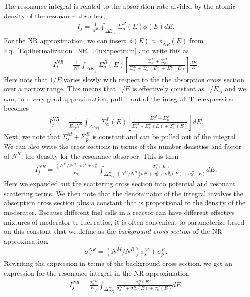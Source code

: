 The resonance integral is related to the absorption rate divided by the atomic density of the resonance absorber,
\begin{align}
  I_j = \frac{1}{N^R} \int_{\Delta E_{rj}} \Sigma_a^R(E) \phi(E) dE .
\end{align}
For the NR approximation, we can insert $\phi(E) \approx \phi_{NR}(E)$ from Eq.~\eqref{Eq:thermalization_NR_FluxSpectrum} and write this as
\begin{align}
  I_j^{NR} = \frac{1}{N^R} \int_{\Delta E_{rj}} \Sigma_a^R(E)  \left[ \frac{ \Sigma_s^M + \Sigma_p^R }{ \Sigma_s^M + \Sigma_s^R(E) + \Sigma_a^R(E) } \right] \frac{dE}{E} . \nonumber
\end{align}
Here note that $1/E$ varies slowly with respect to the the absorption cross section over a narrow range. This means that $1/E$ is effectively constant as $1/E_{rj}$ and we can, to a very good approximation, pull it out of the integral. The expression becomes
\begin{align}
  I_j^{NR} = \frac{1}{E_{rj} N^R} \int_{\Delta E_{rj}} \Sigma_a^R(E)  \left[ \frac{ \Sigma_s^M + \Sigma_p^R }{ \Sigma_s^M + \Sigma_s^R(E) + \Sigma_a^R(E) } \right] dE . \nonumber
\end{align}
Next, we note that $\Sigma_s^M + \Sigma_p^R$ is constant and can be pulled out of the integral. We can also write the cross sections in terms of the number densities and factor of $N^R$, the density for the resonance absorber. This is then
\begin{align}
  I_j^{NR} = \frac{(N^M/N^R) \sigma_s^M + \sigma_p^R }{E_{rj}} \int_{\Delta E_{rj}} \frac{ \sigma_a^R(E)  }{ (N^M/N^R) \sigma_s^M + \sigma_p^R + \sigma_{rs}^R(E) + \sigma_a^R(E) } dE .  \label{Eq:thermalization_resonanceIntegral_NR_expandedForm}
\end{align}
Here we expanded out the scattering cross section into potential and resonant scattering terms. We then note that the denominator of the integral involves the absorption cross section plus a constant that is proportional to the density of the moderator. Because different fuel cells in a reactor can have different effective mixtures of moderator to fuel ratios, it is often convenient to parameterize based on this constant that we define as the \emph{background cross section} of the NR approximation,
\begin{align}
  \sigma_b^{NR} = (N^M/N^R) \sigma_s^M + \sigma_p^R. \label{Eq:thermalization_backgroundXS_NR}
\end{align}
Rewriting the expression in terms of the background cross section, we get an expression for the resonance integral in the NR approximation
\begin{align}
  I_j^{NR} = \frac{ \sigma_b^{NR} }{E_{rj}} \int_{\Delta E_{rj}} \frac{ \sigma_a^R(E)  }{ \sigma_b^{NR} + \sigma_{rs}^R(E) + \sigma_a^R(E) } dE . \label{Eq:thermalization_resonanceIntegral_NR}
\end{align}

